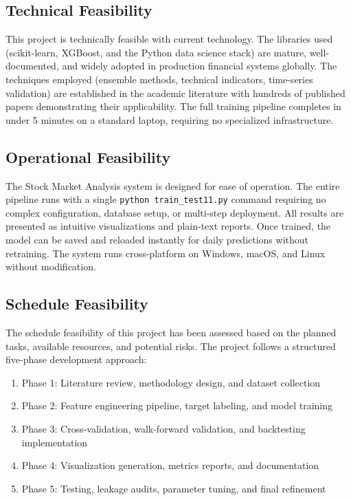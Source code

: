 \documentclass[12pt, a4paper]{report}
\begin{document}
	\subsection{Technical Feasibility}
	This project is technically feasible with current technology. The libraries used (scikit-learn, XGBoost, and the Python data science stack) are mature, well-documented, and widely adopted in production financial systems globally. The techniques employed (ensemble methods, technical indicators, time-series validation) are established in the academic literature with hundreds of published papers demonstrating their applicability. The full training pipeline completes in under 5 minutes on a standard laptop, requiring no specialized infrastructure.
	
	\subsection{Operational Feasibility}
	The Stock Market Analysis system is designed for ease of operation. The entire pipeline runs with a single \texttt{python train\_test11.py} command requiring no complex configuration, database setup, or multi-step deployment. All results are presented as intuitive visualizations and plain-text reports. Once trained, the model can be saved and reloaded instantly for daily predictions without retraining. The system runs cross-platform on Windows, macOS, and Linux without modification.
	
	\subsection{Schedule Feasibility}
	The schedule feasibility of this project has been assessed based on the planned tasks, available resources, and potential risks. The project follows a structured five-phase development approach:
	\vspace{-18pt}
	\begin{enumerate}
		\renewcommand{\labelenumi}{\roman{enumi}.}
		\item Phase 1: Literature review, methodology design, and dataset collection
		\item Phase 2: Feature engineering pipeline, target labeling, and model training
		\item Phase 3: Cross-validation, walk-forward validation, and backtesting implementation
		\item Phase 4: Visualization generation, metrics reports, and documentation
		\item Phase 5: Testing, leakage audits, parameter tuning, and final refinement
	\end{enumerate}
	
\end{document}
